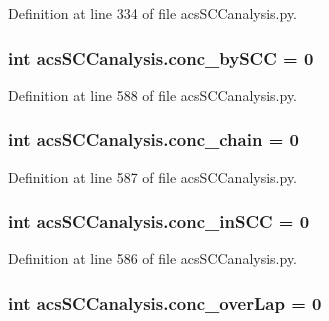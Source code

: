 Definition at line 334 of file acs\-S\-C\-Canalysis.\-py.

\hypertarget{a00128_aac2f508d526d62bd7f9d4f5a5f8b1821}{
\subsubsection[{conc\-\_\-by\-S\-C\-C}]{\setlength{\rightskip}{0pt plus 5cm}int acs\-S\-C\-Canalysis.\-conc\-\_\-by\-S\-C\-C = 0}}\label{a00128_aac2f508d526d62bd7f9d4f5a5f8b1821}


Definition at line 588 of file acs\-S\-C\-Canalysis.\-py.

\hypertarget{a00128_a3188cc39362e42ecb36d23a98f2b5a78}{
\subsubsection[{conc\-\_\-chain}]{\setlength{\rightskip}{0pt plus 5cm}int acs\-S\-C\-Canalysis.\-conc\-\_\-chain = 0}}\label{a00128_a3188cc39362e42ecb36d23a98f2b5a78}


Definition at line 587 of file acs\-S\-C\-Canalysis.\-py.

\hypertarget{a00128_a3fcb8f9c7e88b5c53f1201a383b38666}{
\subsubsection[{conc\-\_\-in\-S\-C\-C}]{\setlength{\rightskip}{0pt plus 5cm}int acs\-S\-C\-Canalysis.\-conc\-\_\-in\-S\-C\-C = 0}}\label{a00128_a3fcb8f9c7e88b5c53f1201a383b38666}


Definition at line 586 of file acs\-S\-C\-Canalysis.\-py.

\hypertarget{a00128_afd3169174539244248b78c8da2bba265}{
\subsubsection[{conc\-\_\-over\-Lap}]{\setlength{\rightskip}{0pt plus 5cm}int acs\-S\-C\-Canalysis.\-conc\-\_\-over\-Lap = 0}}\label{a00128_afd3169174539244248b78c8da2bba265}


